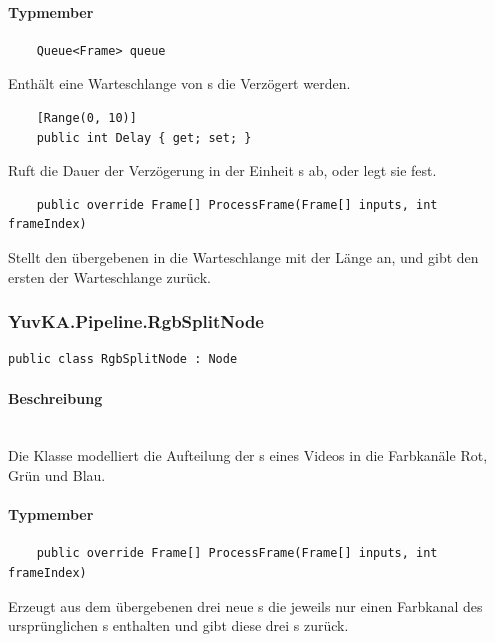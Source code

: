 \paragraph{Typmember}
\begin{itemize}

	\begin{verbatim}
	Queue<Frame> queue
	\end{verbatim}
	Enthält eine Warteschlange von s die Verzögert werden.
	
	\begin{verbatim}
	[Range(0, 10)]
	public int Delay { get; set; }
	\end{verbatim}
	Ruft die Dauer der Verzögerung in der Einheit s ab, oder legt sie fest.

	\begin{verbatim}
	public override Frame[] ProcessFrame(Frame[] inputs, int frameIndex)
	\end{verbatim}
	Stellt den übergebenen  in die Warteschlange  mit der Länge  an, und gibt den ersten  der Warteschlange zurück.
	
\end{itemize}

\subsubsection{YuvKA.Pipeline.RgbSplitNode}

\begin{verbatim}
public class RgbSplitNode : Node
\end{verbatim}

\paragraph{Beschreibung}~\\
Die Klasse  modelliert die Aufteilung der s eines Videos in die Farbkanäle Rot, Grün und Blau.

\paragraph{Typmember}
\begin{itemize}

	\begin{verbatim}
	public override Frame[] ProcessFrame(Frame[] inputs, int frameIndex)
	\end{verbatim}
	Erzeugt aus dem übergebenen  drei neue s die jeweils nur einen Farbkanal des ursprünglichen s enthalten und gibt diese drei s zurück.
	
\end{itemize}